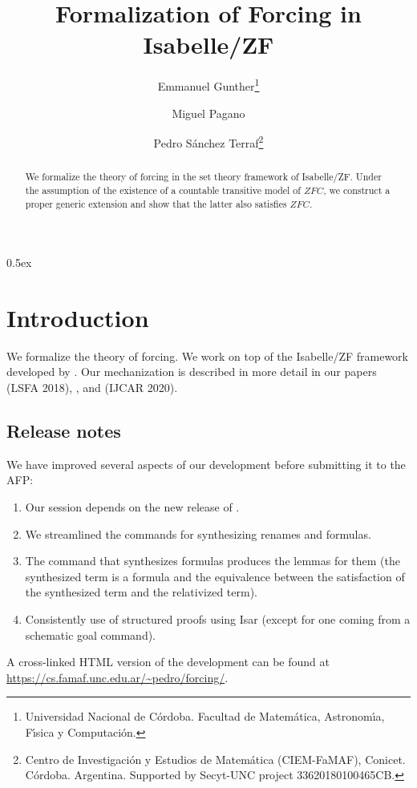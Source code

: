 \documentclass[11pt,a4paper]{article}
\newcommand{\axiomas}[1]{\mathit{#1}}
\newcommand{\ZFC}{\axiomas{ZFC}}
\begin{document}
\title{Formalization of Forcing in Isabelle/ZF}
\author{Emmanuel Gunther\thanks{Universidad Nacional de C\'ordoba. 
    Facultad de Matem\'atica, Astronom\'{\i}a,  F\'{\i}sica y
    Computaci\'on.}
  \and
  Miguel Pagano\footnotemark[1]
  \and
  Pedro S\'anchez Terraf\footnotemark[1] \thanks{Centro de Investigaci\'on y Estudios de Matem\'atica
    (CIEM-FaMAF), Conicet. C\'ordoba. Argentina.
    Supported by Secyt-UNC project 33620180100465CB.}
}
\maketitle

\begin{abstract}
  We formalize the theory of forcing in the set theory framework of
  Isabelle/ZF. Under the assumption of the existence of a countable
  transitive model of $\ZFC$, we construct a proper generic extension and show
  that the latter also satisfies $\ZFC$.
\end{abstract}


\tableofcontents

\parindent 0pt\parskip 0.5ex

\section{Introduction}
We formalize the theory of forcing. We work on top of the Isabelle/ZF
framework developed by \citet{DBLP:journals/jar/PaulsonG96}. Our
mechanization is described in more detail in our papers
\cite{2018arXiv180705174G} (LSFA 2018), \cite{2019arXiv190103313G},
and \cite{2020arXiv200109715G} (IJCAR 2020).

\subsection*{Release notes}
\label{sec:release-notes}

We have improved several aspects of our development before submitting
it to the AFP:
\begin{enumerate}
\item Our session  depends on the new release of
  .
\item We streamlined the commands for synthesizing renames and formulas.
\item The command that synthesizes formulas produces the lemmas for
  them (the synthesized term is a formula and the equivalence between
  the satisfaction of the synthesized term and the relativized term).
\item Consistently use of structured proofs using Isar (except for one
  coming from a schematic goal command).
\end{enumerate}

A cross-linked HTML version of the development can be found at
\url{https://cs.famaf.unc.edu.ar/~pedro/forcing/}.





\end{document}
